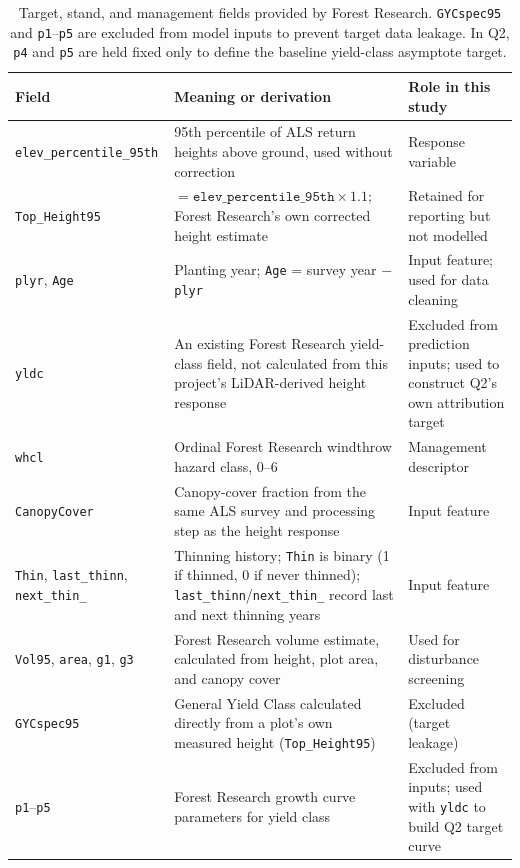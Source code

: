 \documentclass[logo,msc,ai]{infthesis}           %
\begin{document}
\begin{table}[!htbp]
\scriptsize
\setlength{\tabcolsep}{3pt}
\renewcommand{\arraystretch}{0.95}
\begin{tabular}{
    >{\raggedright\arraybackslash}p{2.6cm}
    >{\raggedright\arraybackslash}p{7.0cm}
    >{\raggedright\arraybackslash}p{3.2cm}
}
\hline
Field & Meaning or derivation & Role in this study \\
\hline
\texttt{elev\_\allowbreak percentile\_\allowbreak 95th} & 95th percentile of ALS return heights above ground, used without correction & Response variable \\
\texttt{Top\_Height95} & $=\texttt{elev\_percentile\_95th}\times1.1$; Forest Research's own corrected height estimate & Retained for reporting but not modelled \\
\texttt{plyr}, \texttt{Age} & Planting year; \texttt{Age} = survey year $-$ \texttt{plyr} & Input feature; used for data cleaning \\
\texttt{yldc} & An existing Forest Research yield-class field, not calculated from this project's LiDAR-derived height response & Excluded from prediction inputs; used to construct Q2's own attribution target \\
\texttt{whcl} & Ordinal Forest Research windthrow hazard class, 0--6 & Management descriptor \\
\texttt{CanopyCover} & Canopy-cover fraction from the same ALS survey and processing step as the height response & Input feature \\
\texttt{Thin}, \texttt{last\_thinn}, \texttt{next\_thin\_} & Thinning history; \texttt{Thin} is binary (1 if thinned, 0 if never thinned); \texttt{last\_thinn}/\texttt{next\_thin\_} record last and next thinning years & Input feature \\
\texttt{Vol95}, \texttt{area}, \texttt{g1}, \texttt{g3} & Forest Research volume estimate, calculated from height, plot area, and canopy cover & Used for disturbance screening \\
\texttt{GYCspec95} & General Yield Class calculated directly from a plot's own measured height (\texttt{Top\_Height95}) & Excluded (target leakage) \\
\texttt{p1}--\texttt{p5} & Forest Research growth curve parameters for yield class & Excluded from inputs; used with \texttt{yldc} to build Q2 target curve \\
\hline
\end{tabular}
\caption{\small{Target, stand, and management fields provided by Forest Research. \texttt{GYCspec95} and \texttt{p1}--\texttt{p5} are excluded from model inputs to prevent target data leakage. In Q2, \texttt{p4} and \texttt{p5} are held fixed only to define the baseline yield-class asymptote target.}}
\label{tab:data-fields}
\end{table}
\end{document}
